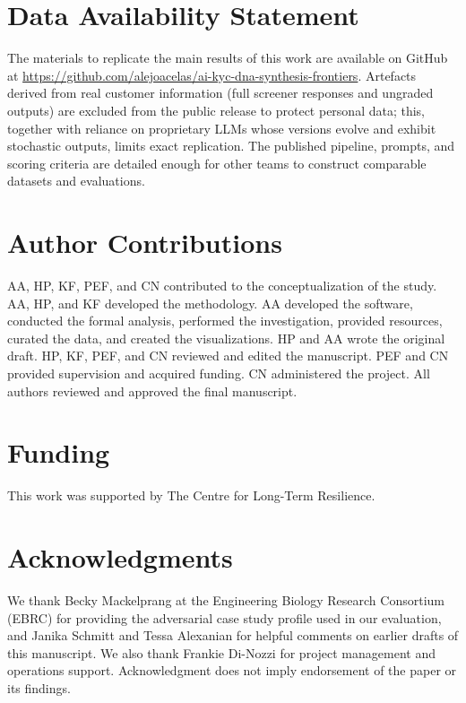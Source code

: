 \documentclass[utf8]{FrontiersinHarvard}
\begin{document}
\section*{Data Availability Statement}

The materials to replicate the main results of this work are available on GitHub at \url{https://github.com/alejoacelas/ai-kyc-dna-synthesis-frontiers}. Artefacts derived from real customer information (full screener responses and ungraded outputs) are excluded from the public release to protect personal data; this, together with reliance on proprietary LLMs whose versions evolve and exhibit stochastic outputs, limits exact replication. The published pipeline, prompts, and scoring criteria are detailed enough for other teams to construct comparable datasets and evaluations.

\section*{Author Contributions}

AA, HP, KF, PEF, and CN contributed to the conceptualization of the study. AA, HP, and KF developed the methodology. AA developed the software, conducted the formal analysis, performed the investigation, provided resources, curated the data, and created the visualizations. HP and AA wrote the original draft. HP, KF, PEF, and CN reviewed and edited the manuscript. PEF and CN provided supervision and acquired funding. CN administered the project. All authors reviewed and approved the final manuscript.

\section*{Funding}

This work was supported by The Centre for Long-Term Resilience.

\section*{Acknowledgments}

We thank Becky Mackelprang at the Engineering Biology Research Consortium (EBRC) for providing the adversarial case study profile used in our evaluation, and Janika Schmitt and Tessa Alexanian for helpful comments on earlier drafts of this manuscript. We also thank Frankie Di-Nozzi for project management and operations support. Acknowledgment does not imply endorsement of the paper or its findings.
\end{document}
